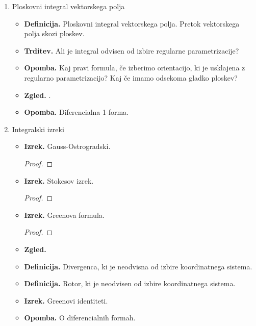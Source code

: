 \begin{enumerate}
    \item Ploskovni integral vektorskega polja
    \begin{itemize}
        \item \textbf{Definicija.} Ploskovni integral vektorskega polja. Pretok vektorskega polja skozi ploskev.
        \item \textbf{Trditev.} Ali je integral odvisen od izbire regularne parametrizacije?
        \item \textbf{Opomba.} Kaj pravi formula, če izberimo orientacijo, ki je usklajena z regularno parametrizacijo? Kaj če imamo odsekoma gladko ploskev?
        \item \textbf{Zgled.} .
        \item \textbf{Opomba.} Diferencialna 1-forma.
    \end{itemize}

    \item Integralski izreki
    \begin{itemize}
        \item \textbf{Izrek.} Gauss-Ostrogradski.
        \begin{proof}
            \todo{}
        \end{proof}
        \item \textbf{Izrek.} Stokesov izrek.
        \begin{proof}
            \todo{}
        \end{proof}
        \item \textbf{Izrek.} Greenova formula.
        \begin{proof}
            \todo{}
        \end{proof}
        \item \textbf{Zgled.} 
        \item \textbf{Definicija.} Divergenca, ki je neodvisna od izbire koordinatnega sistema.
        \item \textbf{Definicija.} Rotor, ki je neodvisen od izbire koordinatnega sistema.
        \item \textbf{Izrek.} Greenovi identiteti.
        \item \textbf{Opomba.} O diferencialnih formah.
    \end{itemize}
\end{enumerate}